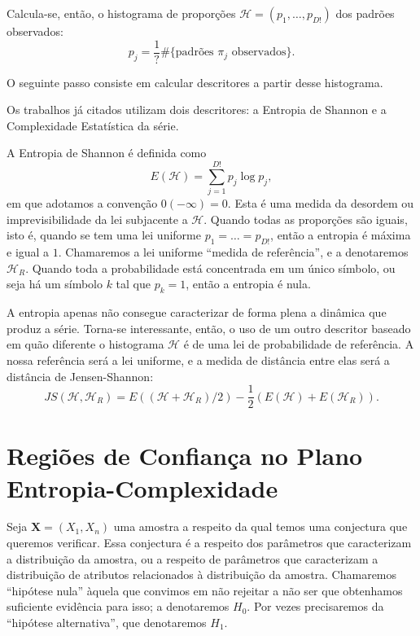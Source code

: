 Calcula-se, então, o histograma de proporções $\mathcal{H} =(p_1,\dots,p_{D!})$ dos padrões observados:
$$
p_j = \frac{1}{?} \# \{
\text{padrões } \pi_j \text{ observados}
\}.
$$

O seguinte passo consiste em calcular descritores a partir desse histograma.

Os trabalhos já citados utilizam dois descritores: a Entropia de Shannon e a Complexidade Estatística da série.

A Entropia de Shannon é definida como
$$
E(\mathcal H) = \sum_{j=1}^{D!} p_j \log p_j,
$$
em que adotamos a convenção $0(-\infty)=0$.
Esta é uma medida da desordem ou imprevisibilidade da lei subjacente a $\mathcal H$.
Quando todas as proporções são iguais, isto é, quando se tem uma lei uniforme $p_1=\dots=p_{D!}$, então a entropia é máxima e igual a $1$.
Chamaremos a lei uniforme ``medida de referência'', e a denotaremos $\mathcal H_R$.
Quando toda a probabilidade está concentrada em um único símbolo, ou seja há um símbolo $k$ tal que $p_k=1$, então a entropia é nula.

A entropia apenas não consegue caracterizar de forma plena a dinâmica que produz a série.
Torna-se interessante, então, o uso de um outro descritor baseado em quão diferente o histograma $\mathcal H$ é de uma lei de probabilidade de referência.
A nossa referência será a lei uniforme, e a medida de distância entre elas será a distância de Jensen-Shannon:
$$
JS(\mathcal H, \mathcal H_R) = E((\mathcal H+ \mathcal H_R)/2) -\frac{1}{2}(E(\mathcal H) + E(\mathcal H_R)).
$$



\section{Regiões de Confiança no Plano Entropia-Complexidade}

Seja $\bm X = (X_1, X_n)$ uma amostra a respeito da qual temos uma conjectura que queremos verificar.
Essa conjectura é a respeito dos parâmetros que caracterizam a distribuição da amostra, ou a respeito de parâmetros que caracterizam a distribuição de atributos relacionados à distribuição da amostra.
Chamaremos ``hipótese nula'' àquela que convimos em não rejeitar a não ser que obtenhamos suficiente evidência para isso; a denotaremos $H_0$.
Por vezes precisaremos da ``hipótese alternativa'', que denotaremos $H_1$.

